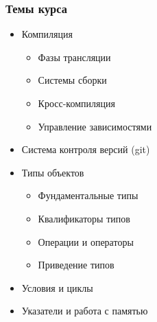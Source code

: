 \documentclass[compress]{beamer}
\subtitle{Введение}
\begin{document}
\frame[plain]{\titlepage}

\begin{frame}

    \frametitle{Темы курса}

    \begin{itemize}

        \item Компиляция

            \begin{itemize}

                \item Фазы трансляции

                \item Системы сборки

                \item Кросс-компиляция

                \item Управление зависимостями

            \end{itemize}

        \item Система контроля версий (git)

        \item Типы объектов

            \begin{itemize}

                \item Фундаментальные типы

                \item Квалификаторы типов

                \item Операции и операторы

                \item Приведение типов

            \end{itemize}

        \item Условия и циклы

        \item Указатели и работа с памятью

    \end{itemize}

\end{frame}
\end{document}
